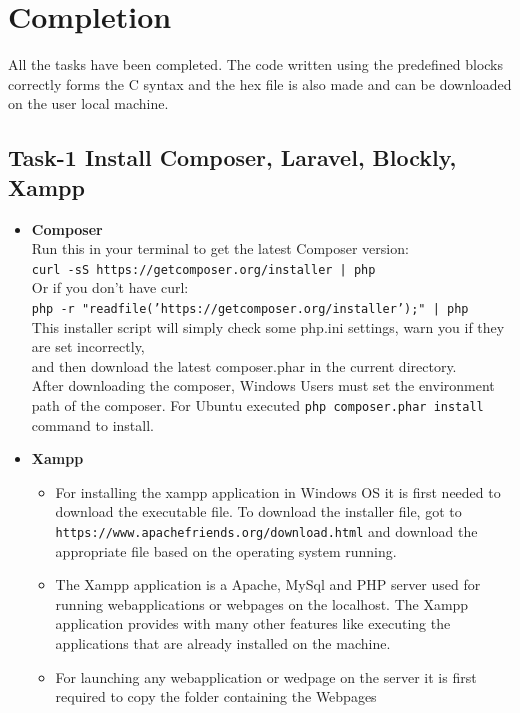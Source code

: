 \documentclass[a4paper,10pt]{report}
\begin{document}
\chapter{Completion}
All the tasks have been completed. The code written using the predefined blocks correctly forms the C syntax and the hex file is also 
made and can be downloaded on the user local machine.
\section{Task-1 Install Composer, Laravel, Blockly, Xampp}
  \begin{itemize}
      \item \textbf{Composer}\\
      Run this in your terminal to get the latest Composer version:\\
	\texttt{curl -sS https://getcomposer.org/installer | php}\\
      Or if you don't have curl:\\
	 \texttt{php -r "readfile('https://getcomposer.org/installer');" | php}\\
      This installer script will simply check some php.ini settings, warn you if they are set incorrectly,\\
      and then download the latest composer.phar in the current directory.\\      
      After downloading the composer, Windows Users must set the environment path of the composer.
      For Ubuntu executed \texttt{php composer.phar install} command to install.
      \newpage
      \item \textbf{Xampp}\\
      \begin{itemize}
      \item 
      For installing the xampp application in Windows OS it is first needed to download the executable file.
      To download the installer file, got to \texttt{https://www.apachefriends.org/download.html}
      and download the appropriate file based on the operating system running. 
      \item
      The Xampp application is a Apache, MySql and PHP server used for running webapplications or webpages on the 
      localhost. The Xampp application provides with many other features like executing the applications that are already
      installed on the machine. 
      \item
      For launching any webapplication or wedpage on the server it is first required to copy the folder containing the Webpages

\end{itemize}
\end{itemize}
\end{document}

